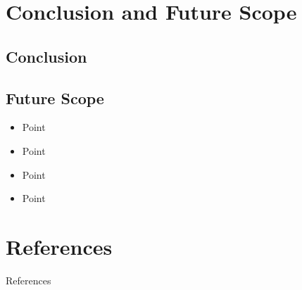 \documentclass{report} %
\begin{document}

	\chapter{Conclusion and Future Scope}
	\pagebreak	
		\section{Conclusion}
		\lipsum[4]
		
		\section{Future Scope}
		\begin{itemize}
			\item Point
			\item Point
			\item Point
			\item Point
		\end{itemize}

	
	\chapter*{References}
	\pagebreak
		References
	\pagebreak
	
	
	\renewcommand{\appendixname}{Annexure} %
	
\end{document}
